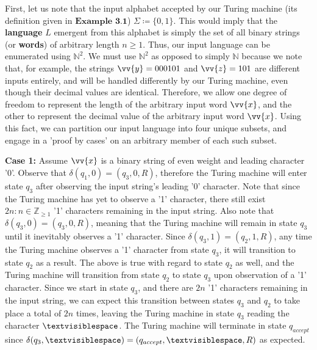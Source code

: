 \documentclass{article}
\begin{document}
\begin{prf}
	First, let us note that the input alphabet accepted by our Turing machine (its definition given in $\textbf{Example 3.1}$) $\Sigma \coloneq \{ 0, 1 \}$.  This would imply that the \textbf{language} $L$ emergent from this alphabet is simply the set of all binary strings (or \textbf{words}) of arbitrary length $n \geq 1$.  Thus, our input language can be enumerated using $\mathbb{N}^{2}$.  We must use $\mathbb{N}^{2}$ as opposed to simply $\mathbb{N}$ because we note that, for example, the strings $\vv{y}=000101$ and $\vv{z}=101$ are different inputs entirely, and will be handled differently by our Turing machine, even though their decimal values are identical.  Therefore, we allow one degree of freedom to represent the length of the arbitrary input word $\vv{x}$, and the other to represent the decimal value of the arbitrary input word $\vv{x}$.  Using this fact, we can partition our input language into four unique subsets, and engage in a 'proof by cases' on an arbitrary member of each such subset.\\
\begin{adjustwidth}{0.5cm}{}
	\textbf{Case 1:} Assume $\vv{x}$ is a binary string of even weight and leading character '0'.  Observe that $\delta(q_{1}, 0) = (q_{3}, 0, R)$, therefore the Turing machine will enter state $q_{3}$ after observing the input string's leading '0' character.  Note that since the Turing machine has yet to observe a '1' character, there still exist $2n : n \in \mathbb{Z}_{\geq 1}$ '1' characters remaining in the input string.  Also note that $\delta(q_{3}, 0) = (q_{3}, 0, R)$, meaning that the Turing machine will remain in state $q_{3}$ until it inevitably observes a '1' character.  Since $\delta(q_{3}, 1) = (q_{2}, 1, R)$, any time the Turing machine observes a '1' character from state $q_{3}$, it will transition to state $q_{2}$ as a result.  The above is true with regard to state $q_{2}$ as well, and the Turing machine will transition from state $q_{2}$ to state $q_{3}$ upon observation of a '1' character.  Since we start in state $q_{3}$, and there are $2n$ '1' characters remaining in the input string, we can expect this transition between states $q_{3}$ and $q_{2}$ to take place a total of $2n$ times, leaving the Turing machine in state $q_{3}$ reading the character $\textvisiblespace$.  The Turing machine will terminate in state $q_{accept}$ since $\delta(q_{3}, \textvisiblespace) = (q_{accept}, \textvisiblespace, R)$ as expected.\\
\end{adjustwidth}

\end{prf}
\end{document}
